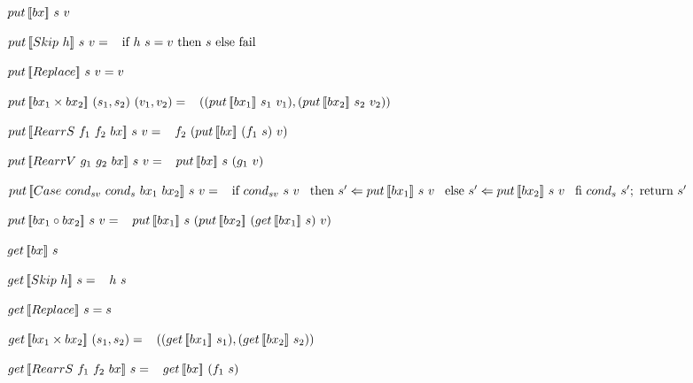 \begin{multicols}{2}
    \begin{definition} \label{def:minbigulput}
        $put \, [\![bx]\!] \ s \ v$

        \noindent $put \, [\![Skip \ h]\!] \ s \ v = \\
            \hspace*{3mm} \text{if } h \ s = v \text{ then } s \text{ else } \text{fail}$
    
        \noindent $put \, [\![Replace]\!] \ s \ v = v$
    
        \noindent $put \, [\![bx_1 \times bx_2]\!] \ (s_1, s_2) \ (v_1, v_2) = \\
            \hspace*{3mm} ((put \, [\![bx_1]\!] \ s_1 \ v_1),(put \, [\![bx_2]\!] \ s_2 \ v_2))$
    
        \noindent $put \, [\![RearrS \ f_1 \ f_2 \ bx]\!] \ s \ v = \\
            \hspace*{3mm} f_2 \ (put \, [\![bx]\!] \ (f_1 \ s) \ v)$
    
        \noindent $put \, [\![RearrV \ g_1 \ g_2 \ bx]\!] \ s \ v = \\
            \hspace*{3mm} put \, [\![bx]\!] \ s \ (g_1 \ v)$
    
        \noindent $\putbx{\casebx{cond_{sv}}{cond_{s}}{bx_1}{bx_2}}{s}{v} =\\
            \tab \text{if} \ {cond_{sv} \ s \ v} \\
            \tab \text{then} \ s' \Leftarrow \putbx{bx_1}{s}{v} \\
            \tab \text{else} \ s' \Leftarrow \putbx{bx_2}{s}{v} \\
            \tab \text{fi} \ cond_{s} \ s'; \ \text{return} \ s'$
    
        \noindent $\putbx{bx_1 \circ bx_2}{s}{v} = \\
            \tab \putbx{bx_1}{s}{(\putbx{bx_2}{(\getbx{bx_1}{s})}{v})}$
    \end{definition}
\columnbreak
    \begin{definition} \label{def:minbigulget}
        $get \, [\![bx]\!] \ s$

        \noindent $get \, [\![Skip \ h]\!] \ s = \\ 
            \hspace*{3mm} h \ s$

        \noindent $get \, [\![Replace]\!] \ s = s$

        \noindent $get \, [\![bx_1 \times bx_2]\!] \ (s_1,s_2) = \\
            \hspace*{3mm} ((get \, [\![bx_1]\!] \ s_1),(get \, [\![bx_2]\!] \ s_2))$

        \noindent $get \, [\![RearrS \ f_1 \ f_2 \ bx]\!] \ s = \\ 
            \hspace*{3mm} get \, [\![bx]\!] \ (f_1 \ s)$


\end{definition}
\end{multicols}

